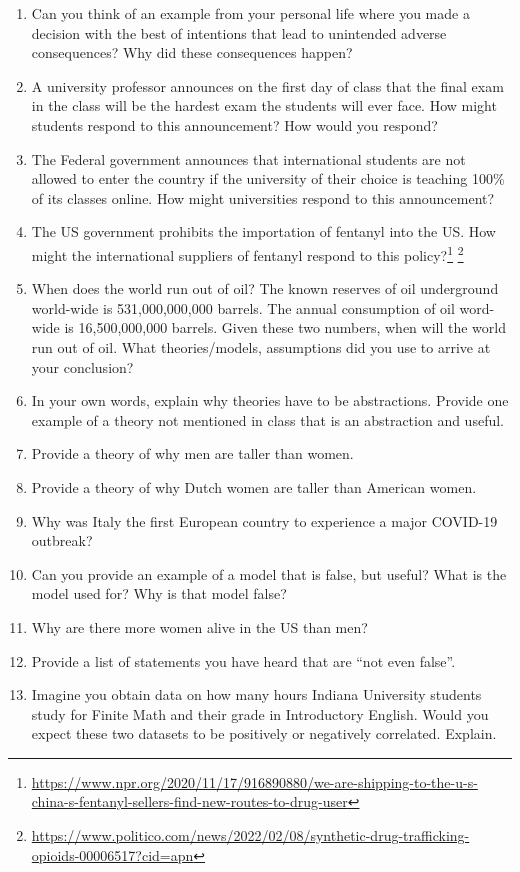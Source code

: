 \documentclass[
]{book}
\providecommand{\tightlist}{%
  \setlength{\itemsep}{0pt}\setlength{\parskip}{0pt}}
\begin{document}
\begin{enumerate}
\def\labelenumi{\arabic{enumi}.}
\tightlist
\item
  Can you think of an example from your personal life where you made a decision with the best of intentions that lead to unintended adverse consequences? Why did these consequences happen?
\item
  A university professor announces on the first day of class that the final exam in the class will be the hardest exam the students will ever face. How might students respond to this announcement? How would you respond?\\
\item
  The Federal government announces that international students are not allowed to enter the country if the university of their choice is teaching 100\% of its classes online. How might universities respond to this announcement?
\item
  The US government prohibits the importation of fentanyl into the US. How might the international suppliers of fentanyl respond to this policy?\footnote{\url{https://www.npr.org/2020/11/17/916890880/we-are-shipping-to-the-u-s-china-s-fentanyl-sellers-find-new-routes-to-drug-user}} \footnote{\url{https://www.politico.com/news/2022/02/08/synthetic-drug-trafficking-opioids-00006517?cid=apn}}
\item
  When does the world run out of oil?
  The known reserves of oil underground world-wide is 531,000,000,000 barrels. The annual consumption of oil word-wide is 16,500,000,000 barrels. Given these two numbers, when will the world run out of oil. What theories/models, assumptions did you use to arrive at your conclusion?
\item
  In your own words, explain why theories have to be abstractions. Provide one example of a theory not mentioned in class that is an abstraction and useful.
\item
  Provide a theory of why men are taller than women.
\item
  Provide a theory of why Dutch women are taller than American women.\\
\item
  Why was Italy the first European country to experience a major COVID-19 outbreak?
\item
  Can you provide an example of a model that is false, but useful? What is the model used for? Why is that model false?
\item
  Why are there more women alive in the US than men?
\item
  Provide a list of statements you have heard that are ``not even false''.
\item
  Imagine you obtain data on how many hours Indiana University students study for Finite Math and their grade in Introductory English. Would you expect these two datasets to be positively or negatively correlated. Explain.
\end{enumerate}
\end{document}
